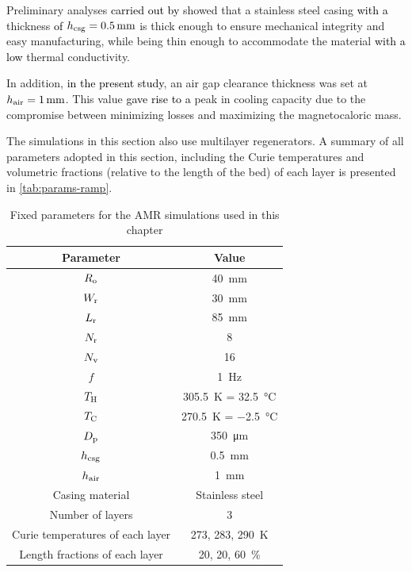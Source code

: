 \documentclass[referee]{svjour3}
\begin{document}

Preliminary analyses \textcolor{black}{carried out by} \cite{bib:peixer17-perfor-amrs} showed that a stainless steel casing \textcolor{black}{with a} thickness \textcolor{black}{of} $h\ped{csg} = \SI{0.5}{\mm}$ is thick enough to ensure mechanical integrity and easy manufacturing, while being thin enough to accommodate the material \textcolor{black}{with a low} thermal conductivity. 

In addition, \textcolor{black}{in the present study}, an air gap clearance thickness was set at $h\ped{air} = \SI{1}{\mm}$. This value \textcolor{black}{gave rise to a} peak in cooling capacity due to the compromise between minimizing losses and maximizing the magnetocaloric mass.

The simulations in this section also use multilayer regenerators. A summary of all parameters adopted in this section, including the Curie temperatures and volumetric fractions (relative to the length of the bed) of each layer is presented in \autoref{tab:params-ramp}.

\begin{table}[!ht]
  \centering
  \begin{tabular}{c|c}
\hline
    \textbf{Parameter} & \textbf{Value} \\
\hline
$R_{\mathrm{o}}$ & \SI{40}{\mm} \\
$W_{\mathrm{r}}$ & \SI{30}{\mm} \\
$L_{\mathrm{r}}$ & \SI{85}{\mm} \\
$N_{\mathrm{r}}$ & \num{8} \\
$N_{\mathrm{v}}$ & \num{16} \\
$f$ & \SI{1}{\hertz} \\
$T_{\mathrm{H}}$ & \SI{305.5}{\kelvin} = \SI{32.5}{\celsius} \\
$T_{\mathrm{C}}$ & \SI{270.5}{\kelvin} = \SI{-2.5}{\celsius} \\
$D_{\mathrm{p}}$ & \SI{350}{\micro\meter} \\
$h_{\mathrm{csg}}$ & \SI{0.5}{\mm} \\
$h_{\mathrm{air}}$ & \SI{1}{\mm} \\
Casing material & Stainless steel \\
Number of layers & \num{3} \\
Curie temperatures of each layer & \num{273}, \num{283}, \SI{290}{\kelvin} \\ 
Length fractions of each layer & \num{20}, \num{20}, \SI{60}{\percent}\\
\hline
  \end{tabular}
  \caption{Fixed parameters for the AMR simulations used in this chapter}
  \label{tab:params-ramp}
\end{table}
\end{document}
